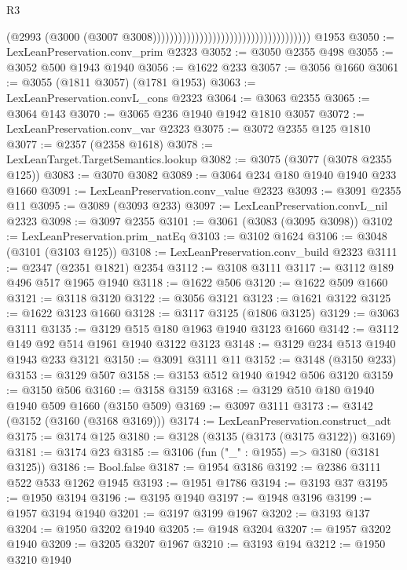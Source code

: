 \begin{lexlean}{R3}
\begin{coremodule}
                                                                        (@2993
                                                                          (@3000
                                                                            (@3007
                                                                              @3008)))))))))))))))))))))))))))))))))))))
    @1953
@3050 := LexLeanPreservation.conv_prim @2323
@3052 := @3050 @2355 @498
@3055 := @3052 @500 @1943 @1940
@3056 := @1622 @233
@3057 := @3056 @1660
@3061 := @3055 (@1811 @3057) (@1781 @1953)
@3063 := LexLeanPreservation.convL_cons @2323
@3064 := @3063 @2355
@3065 := @3064 @143
@3070 := @3065 @236 @1940 @1942 @1810 @3057
@3072 := LexLeanPreservation.conv_var @2323
@3075 := @3072 @2355 @125 @1810
@3077 := @2357 (@2358 @1618)
@3078 := LexLeanTarget.TargetSemantics.lookup
@3082 := @3075 (@3077 (@3078 @2355 @125))
@3083 := @3070 @3082
@3089 := @3064 @234 @180 @1940 @1940 @233 @1660
@3091 := LexLeanPreservation.conv_value @2323
@3093 := @3091 @2355 @11
@3095 := @3089 (@3093 @233)
@3097 := LexLeanPreservation.convL_nil @2323
@3098 := @3097 @2355
@3101 := @3061 (@3083 (@3095 @3098))
@3102 := LexLeanPreservation.prim_natEq
@3103 := @3102 @1624
@3106 := @3048 (@3101 (@3103 @125))
@3108 := LexLeanPreservation.conv_build @2323
@3111 := @2347 (@2351 @1821) @2354
@3112 := @3108 @3111
@3117 := @3112 @189 @496 @517 @1965 @1940
@3118 := @1622 @506
@3120 := @1622 @509 @1660
@3121 := @3118 @3120
@3122 := @3056 @3121
@3123 := @1621 @3122
@3125 := @1622 @3123 @1660
@3128 := @3117 @3125 (@1806 @3125)
@3129 := @3063 @3111
@3135 := @3129 @515 @180 @1963 @1940 @3123 @1660
@3142 := @3112 @149 @92 @514 @1961 @1940 @3122 @3123
@3148 := @3129 @234 @513 @1940 @1943 @233 @3121
@3150 := @3091 @3111 @11
@3152 := @3148 (@3150 @233)
@3153 := @3129 @507
@3158 := @3153 @512 @1940 @1942 @506 @3120
@3159 := @3150 @506
@3160 := @3158 @3159
@3168 := @3129 @510 @180 @1940 @1940 @509 @1660 (@3150 @509)
@3169 := @3097 @3111
@3173 := @3142 (@3152 (@3160 (@3168 @3169)))
@3174 := LexLeanPreservation.construct_adt
@3175 := @3174 @125
@3180 := @3128 (@3135 (@3173 (@3175 @3122)) @3169)
@3181 := @3174 @23
@3185 := @3106 (fun ("_" : @1955) => @3180 (@3181 @3125))
@3186 := Bool.false
@3187 := @1954 @3186
@3192 := @2386 @3111 @522 @533 @1262 @1945
@3193 := @1951 @1786
@3194 := @3193 @37
@3195 := @1950 @3194
@3196 := @3195 @1940
@3197 := @1948 @3196
@3199 := @1957 @3194 @1940
@3201 := @3197 @3199 @1967
@3202 := @3193 @137
@3204 := @1950 @3202 @1940
@3205 := @1948 @3204
@3207 := @1957 @3202 @1940
@3209 := @3205 @3207 @1967
@3210 := @3193 @194
@3212 := @1950 @3210 @1940

\end{coremodule}
\end{lexlean}
